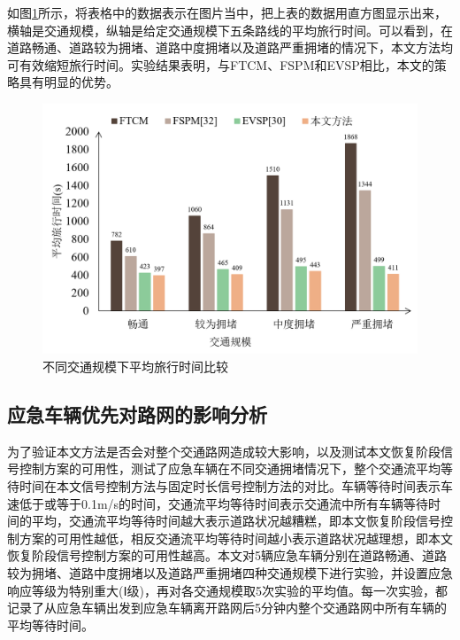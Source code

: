如图\ref{fig:ave_travel_time}所示，将表格中的数据表示在图片当中，把上表的数据用直方图显示出来，横轴是交通规模，纵轴是给定交通规模下五条路线的平均旅行时间。可以看到，在道路畅通、道路较为拥堵、道路中度拥堵以及道路严重拥堵的情况下，本文方法均可有效缩短旅行时间。实验结果表明，与FTCM、FSPM和EVSP相比，本文的策略具有明显的优势。

\begin{figure}[H]
	\centering
	\includegraphics[width=\linewidth]{figures/ave_travel_time.png}
	\caption{不同交通规模下平均旅行时间比较}
	\label{fig:ave_travel_time}
\end{figure}


\subsection{应急车辆优先对路网的影响分析}
为了验证本文方法是否会对整个交通路网造成较大影响，以及测试本文恢复阶段信号控制方案的可用性，测试了应急车辆在不同交通拥堵情况下，整个交通流平均等待时间在本文信号控制方法与固定时长信号控制方法的对比。车辆等待时间表示车速低于或等于0.1m/s的时间，交通流平均等待时间表示交通流中所有车辆等待时间的平均，交通流平均等待时间越大表示道路状况越糟糕，即本文恢复阶段信号控制方案的可用性越低，相反交通流平均等待时间越小表示道路状况越理想，即本文恢复阶段信号控制方案的可用性越高。本文对5辆应急车辆分别在道路畅通、道路较为拥堵、道路中度拥堵以及道路严重拥堵四种交通规模下进行实验，并设置应急响应等级为特别重大(Ⅰ级)，再对各交通规模取5次实验的平均值。每一次实验，都记录了从应急车辆出发到应急车辆离开路网后5分钟内整个交通路网中所有车辆的平均等待时间。

